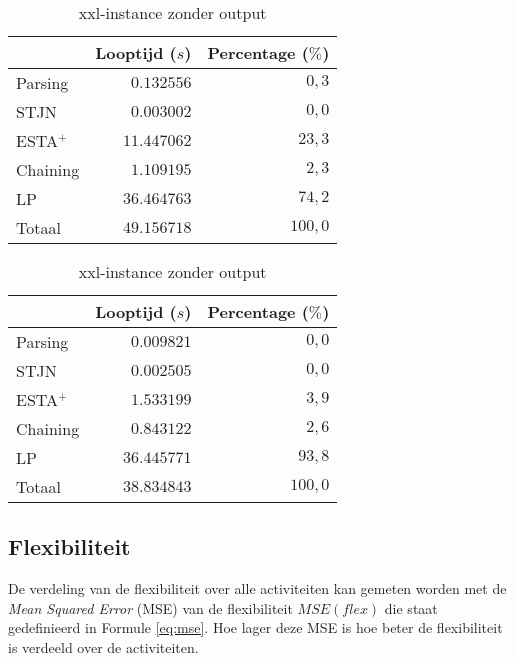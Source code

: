 \begin{table}[H]
\parbox{.45\linewidth}{
    \centering
    \begin{tabular}{| l | r | r |}
        \hline
                    & Looptijd ($s$)  & Percentage ($\%$) \\
        \hline
        Parsing     &  $0.132556$     & $0,3$   \\
        STJN        &  $0.003002$     & $0,0$   \\
        ESTA$^+$    & $11.447062$     & $23,3$  \\
        Chaining    &  $1.109195$     & $2,3$   \\
        LP          & $36.464763$     & $74,2$  \\
        \hline \hline
        Totaal      & $49.156718$     & $100,0$ \\
        \hline
    \end{tabular}
    \caption{xxl-instance met output}
    \label{tbl:xxl+output}
}
\hfill
\parbox{.45\linewidth}{
    \centering
    \begin{tabular}{| l | r | r |}
        \hline
                    & Looptijd ($s$)& Percentage ($\%$) \\
        \hline
        Parsing     &  $0.009821$      &  $0,0$  \\
        STJN        &  $0.002505$      &  $0,0$  \\
        ESTA$^+$    &  $1.533199$      &  $3,9$  \\
        Chaining    &  $0.843122$      &  $2,6$  \\
        LP          & $36.445771$      & $93,8$  \\
        \hline \hline
        Totaal      & $38.834843$      & $100,0$ \\
        \hline
    \end{tabular}
    \caption{xxl-instance zonder output}
    \label{tbl:xxl-output}
}
\end{table}


\subsection{Flexibiliteit}
\label{subsec:flexibiliteit}
De verdeling van de flexibiliteit over alle activiteiten kan gemeten worden met de \emph{Mean Squared Error} (MSE) van de flexibiliteit $MSE(flex)$ die staat gedefinieerd in Formule \ref{eq:mse}. Hoe lager deze MSE is hoe beter de flexibiliteit is verdeeld over de activiteiten.

